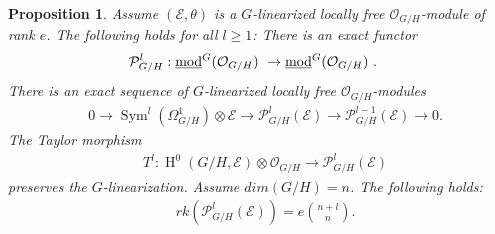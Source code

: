 \documentclass{amsart}
\theoremstyle{plain}
\newtheorem{proposition}[theorem]{Proposition}
\theoremstyle{definition}
\theoremstyle{remark}
\numberwithin{equation}{theorem}
\begin{document}
\begin{proposition} \label{glinearization} 
Assume $({\mathcal{E}},\theta)$ is a $G$-linearized locally free ${\mathcal{O} }_{G/H}$-module of
rank $e$. The following holds for all $l\geq 1$:
There is an exact functor
\begin{align}
&\label{pp0} {\mathcal{P} }^l_{G/H}:\text{\underline{mod}$^G({\mathcal{O} }_{G/H}$) }\rightarrow \text{\underline{mod}$^G({\mathcal{O} }_{G/H}$) }.
\end{align}
There is an exact sequence of $G$-linearized locally free ${\mathcal{O} }_{G/H}$-modules
\begin{align}
&\label{pp1} 0\rightarrow {\operatorname{Sym} }^l(\Omega^1_{G/H})\otimes {\mathcal{E}}\rightarrow
{\mathcal{P} }^l_{G/H}({\mathcal{E}})\rightarrow {\mathcal{P} }^{l-1}_{G/H}({\mathcal{E}})\rightarrow 0 .
\end{align}
The Taylor morphism
\begin{align}
&\label{pp3}T^l:{\operatorname{H} }^0(G/H,{\mathcal{E}})\otimes {\mathcal{O} }_{G/H} \rightarrow {\mathcal{P} }^l_{G/H}({\mathcal{E}})
\end{align}
preserves the $G$-linearization.
Assume $dim(G/H)=n$. The following holds:
\begin{align}
&\label{pp2} rk({\mathcal{P} }^l_{G/H}({\mathcal{E}}))=e\binom{n+l}{n}.
\end{align}
\end{proposition}
\end{document}
